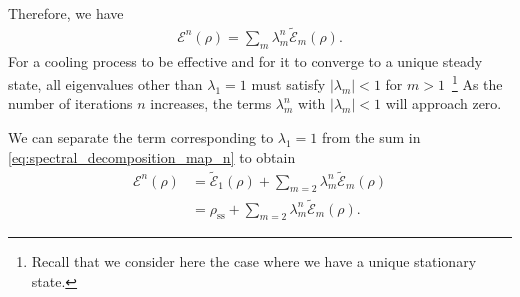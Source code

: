 Therefore, we have
\begin{align}
    \mathcal{E}^n(\rho) = \sum_{m} \lambda_m^n \tilde{\mathcal{E}}_m(\rho).
    \label{eq:spectral_decomposition_map_n}
\end{align}
For a cooling process to be effective and for it to converge to a unique steady state, all eigenvalues other than $\lambda_1 = 1$ must satisfy $|\lambda_m| < 1$ for $m > 1$~\footnote{Recall that we consider here the case where we have a unique stationary state.} As the number of iterations $n$ increases, the terms $\lambda_m^n$ with $|\lambda_m| < 1$ will approach zero.

We can separate the term corresponding to $\lambda_1 = 1$ from the sum in \cref{eq:spectral_decomposition_map_n} to obtain
\begin{align}
    \mathcal{E}^n(\rho) &= \tilde{\mathcal{E}}_1(\rho) + \sum_{m=2} \lambda_m^n \tilde{\mathcal{E}}_m(\rho)\nonumber\\
                        &= \rho_\text{ss} + \sum_{m=2} \lambda_m^n \tilde{\mathcal{E}}_m(\rho).
\end{align}

